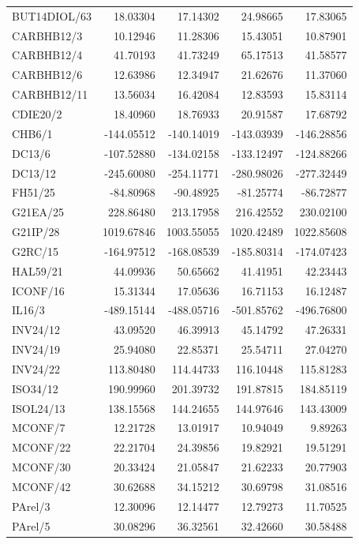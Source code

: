 \documentclass[10pt,a4paper]{article}
\begin{document}
{\begin{longtable}{@{}lrrrr@{}}
BUT14DIOL/63 & 18.03304 & 17.14302 & 24.98665 & 17.83065 \\
CARBHB12/3 & 10.12946 & 11.28306 & 15.43051 & 10.87901 \\
CARBHB12/4 & 41.70193 & 41.73249 & 65.17513 & 41.58577 \\
CARBHB12/6 & 12.63986 & 12.34947 & 21.62676 & 11.37060 \\
CARBHB12/11 & 13.56034 & 16.42084 & 12.83593 & 15.83114 \\
CDIE20/2 & 18.40960 & 18.76933 & 20.91587 & 17.68792 \\
CHB6/1 & -144.05512 & -140.14019 & -143.03939 & -146.28856 \\
DC13/6 & -107.52880 & -134.02158 & -133.12497 & -124.88266 \\
DC13/12 & -245.60080 & -254.11771 & -280.98026 & -277.32449 \\
FH51/25 & -84.80968 & -90.48925 & -81.25774 & -86.72877 \\
G21EA/25 & 228.86480 & 213.17958 & 216.42552 & 230.02100 \\
G21IP/28 & 1019.67846 & 1003.55055 & 1020.42489 & 1022.85608 \\
G2RC/15 & -164.97512 & -168.08539 & -185.80314 & -174.07423 \\
HAL59/21 & 44.09936 & 50.65662 & 41.41951 & 42.23443 \\
ICONF/16 & 15.31344 & 17.05636 & 16.71153 & 16.12487 \\
IL16/3 & -489.15144 & -488.05716 & -501.85762 & -496.76800 \\
INV24/12 & 43.09520 & 46.39913 & 45.14792 & 47.26331 \\
INV24/19 & 25.94080 & 22.85371 & 25.54711 & 27.04270 \\
INV24/22 & 113.80480 & 114.44733 & 116.10448 & 115.81283 \\
ISO34/12 & 190.99960 & 201.39732 & 191.87815 & 184.85119 \\
ISOL24/13 & 138.15568 & 144.24655 & 144.97646 & 143.43009 \\
MCONF/7 & 12.21728 & 13.01917 & 10.94049 & 9.89263 \\
MCONF/22 & 22.21704 & 24.39856 & 19.82921 & 19.51291 \\
MCONF/30 & 20.33424 & 21.05847 & 21.62233 & 20.77903 \\
MCONF/42 & 30.62688 & 34.15212 & 30.69798 & 31.08516 \\
PArel/3 & 12.30096 & 12.14477 & 12.79273 & 11.70525 \\
PArel/5 & 30.08296 & 36.32561 & 32.42660 & 30.58488 \\

\end{longtable}}
\end{document}
